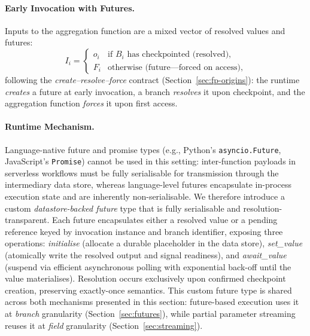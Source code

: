 \documentclass[runningheads]{llncs}
\begin{document}
\paragraph{Early Invocation with Futures.}
Inputs to the aggregation function are a mixed vector of resolved values and futures:
\[
I_i =
\begin{cases}
o_i & \text{if } B_i \text{ has checkpointed (resolved)}, \\
F_i & \text{otherwise (future---forced on access)},
\end{cases}
\]
following the \emph{create--resolve--force} contract (Section~\ref{sec:fp-origins}): the runtime \emph{creates} a future at early invocation, a branch \emph{resolves} it upon checkpoint, and the aggregation function \emph{forces} it upon first access.

\paragraph{Runtime Mechanism.}
Language-native future and promise types (e.g., Python's \texttt{asyncio.Future}, JavaScript's \texttt{Promise}) cannot be used in this setting: inter-function payloads in serverless workflows must be fully serialisable for transmission through the intermediary data store, whereas language-level futures encapsulate in-process execution state and are inherently non-serialisable. We therefore introduce a custom \emph{datastore-backed future} type that is fully serialisable and resolution-transparent. Each future encapsulates either a resolved value or a pending reference keyed by invocation instance and branch identifier, exposing three operations: \emph{initialise} (allocate a durable placeholder in the data store), \emph{set\_value} (atomically write the resolved output and signal readiness), and \emph{await\_value} (suspend via efficient asynchronous polling with exponential back-off until the value materialises). Resolution occurs exclusively upon confirmed checkpoint creation, preserving exactly-once semantics. This custom future type is shared across both mechanisms presented in this section: future-based execution uses it at \emph{branch} granularity (Section~\ref{sec:futures}), while partial parameter streaming reuses it at \emph{field} granularity (Section~\ref{sec:streaming}).
\end{document}
